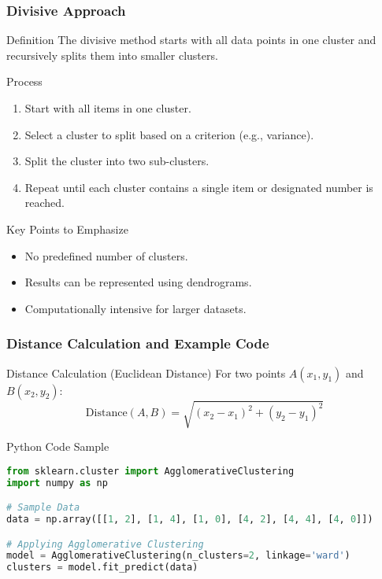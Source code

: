 \documentclass{beamer}
\begin{document}
\begin{frame}[fragile]
    \frametitle{Divisive Approach}
    \begin{block}{Definition}
        The divisive method starts with all data points in one cluster and recursively splits them into smaller clusters.
    \end{block}
    
    \begin{block}{Process}
        \begin{enumerate}
            \item Start with all items in one cluster.
            \item Select a cluster to split based on a criterion (e.g., variance).
            \item Split the cluster into two sub-clusters.
            \item Repeat until each cluster contains a single item or designated number is reached.
        \end{enumerate}
    \end{block}
    
    \begin{block}{Key Points to Emphasize}
        \begin{itemize}
            \item No predefined number of clusters.
            \item Results can be represented using dendrograms.
            \item Computationally intensive for larger datasets.
        \end{itemize}
    \end{block}
\end{frame}

\begin{frame}[fragile]
    \frametitle{Distance Calculation and Example Code}
    \begin{block}{Distance Calculation (Euclidean Distance)}
        For two points \( A(x_1, y_1) \) and \( B(x_2, y_2) \):
        \begin{equation}
            \text{Distance}(A, B) = \sqrt{(x_2 - x_1)^2 + (y_2 - y_1)^2}
        \end{equation}
    \end{block}
    
    \begin{block}{Python Code Sample}
    \begin{lstlisting}[language=Python]
from sklearn.cluster import AgglomerativeClustering
import numpy as np

# Sample Data
data = np.array([[1, 2], [1, 4], [1, 0], [4, 2], [4, 4], [4, 0]])

# Applying Agglomerative Clustering
model = AgglomerativeClustering(n_clusters=2, linkage='ward')
clusters = model.fit_predict(data)
    \end{lstlisting}
    \end{block}
\end{frame}
\end{document}
